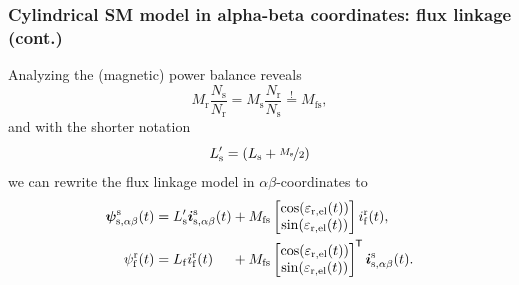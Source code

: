 \begin{frame}
	\frametitle{Cylindrical SM model in alpha-beta coordinates: flux linkage (cont.)}
	Analyzing the (magnetic) power balance reveals
    \begin{equation}
        M_\mathrm{r}\frac{N_\mathrm{s}}{N_\mathrm{r}} = M_{\mathrm{s}}\frac{N_\mathrm{r}}{N_\mathrm{s}} \stackrel{!}{=} M_\mathrm{fs}, 
    \end{equation}
    and with the shorter notation 
		\begin{equation}
			L'_\mathrm{s} = (L_\mathrm{s} +\nicefrac{M_\mathrm{s}}{2})
		\end{equation}
	we can rewrite the flux linkage model in $\alpha\beta$-coordinates to
	\begin{equation}
		\begin{alignedat}{2}
			\bm{\psi}^\mathrm{s}_\mathrm{s,\alpha\beta}(t) &= L'_\mathrm{s} \bm{i}^\mathrm{s}_{\mathrm{s},\alpha\beta}(t) &&+ M_\mathrm{fs} \begin{bmatrix}\cos(\varepsilon_\mathrm{r,el}(t))\\ \sin(\varepsilon_\mathrm{r,el}(t))\end{bmatrix} i^\mathrm{r}_{\mathrm{f}}(t),\\
			\psi^\mathrm{r}_\mathrm{f}(t) &= L_\mathrm{f} i^\mathrm{r}_\mathrm{f}(t) &&+ M_\mathrm{fs} \begin{bmatrix}\cos(\varepsilon_\mathrm{r,el}(t)) \\ \sin(\varepsilon_\mathrm{r,el}(t))\end{bmatrix}^{\mkern-1.5mu\mathsf{T}}\bm{i}^\mathrm{s}_\mathrm{s,\alpha\beta}(t).
		\end{alignedat}
		\label{eq:Flux_linkage_model_SM_alpha_beta}
	\end{equation}
\end{frame}

